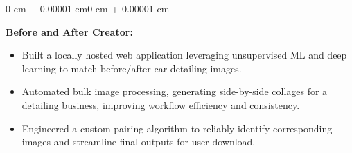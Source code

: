 \documentclass[11pt, letterpaper]{article}
\newenvironment{highlights}{
    \begin{itemize}[
        topsep=0.10 cm,
        parsep=0.10 cm,
        partopsep=0pt,
        itemsep=0pt,
        leftmargin=0.4 cm + 10pt
    ]
}{
    \end{itemize}
}
\newenvironment{onecolentry}{
    \begin{adjustwidth}{0 cm + 0.00001 cm}{0 cm + 0.00001 cm}
}{
    \end{adjustwidth}
}
\begin{document}
\vspace{0.4 cm}

\begin{onecolentry}
    \textbf{Before and After Creator:}
    \begin{highlights}
        \item Built a locally hosted web application leveraging unsupervised ML and deep learning to match before/after car detailing images.
        \item Automated bulk image processing, generating side-by-side collages for a detailing business, improving workflow efficiency and consistency.
        \item Engineered a custom pairing algorithm to reliably identify corresponding images and streamline final outputs for user download.
    \end{highlights}
\end{onecolentry}
\end{document}
